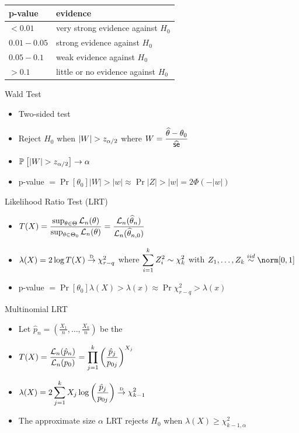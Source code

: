 \documentclass[landscape]{article}
\newenvironment{titemize}[1]{
  \begin{minipage}[h]{\columnwidth}
    #1
    \begin{itemize}
}{
    \end{itemize}
  \end{minipage}
}
\begin{document}
\begin{multicols*}{2}
\centering
\begin{tabular}{ll}
  \textsf{p-value} & \textsf{evidence} \\
  \hline
  $< 0.01$      & very strong evidence against $H_0$ \\
  $0.01 - 0.05$ & strong evidence against $H_0$ \\
  $0.05 - 0.1$  & weak evidence against $H_0$ \\
  $> 0.1$       & little or no evidence against $H_0$ \\
\end{tabular}

\raggedright
Wald Test
\begin{itemize}
  \item Two-sided test
  \item Reject $H_0$ when $|W| > z_{\alpha/2}$ where 
    $W = \displaystyle\frac{\widehat{\theta} - \theta_0}{\widehat{\textsf{se}}}$
  \item $\mathbb{P}_{}\left[|W| > z_{\alpha/2}\right] \rightarrow \alpha$
  \item p-value $= \Pr[\theta_0]{|W| > |w|} 
                 \approx \Pr{|Z| > |w|}
                 = 2\Phi(-|w|)$
\end{itemize}

Likelihood Ratio Test (LRT)
\begin{itemize}
 \item $T(X) = \displaystyle\frac{\sup_{\theta\in\Theta}\Lln(\theta)}%
                                 {\sup_{\theta\in\Theta_0}\Lln(\theta)}
             = \frac{\Lln(\that_n)}{\Lln(\that_{n,0})}$
 \item $\lambda(X) = 2\log T(X) \stackrel{\text{\tiny{D}}}{\rightarrow} \chi_{r-q}^2$ 
  where $\displaystyle\sum_{i=1}^k Z_i^2 \sim \chi_k^2$ with 
    $Z_1,\dots,Z_k \distiid \norm[0,1]$
  \item p-value $= \Pr[\theta_0]{\lambda(X) > \lambda(x)} 
                 \approx \Pr{\chi_{r-q}^2 > \lambda(x)}$
\end{itemize}

\begin{titemize}{Multinomial LRT}
  \item Let 
    $\hat p_n = \displaystyle \left(\frac{X_1}{n},\dots,\frac{X_k}{n}\right)$ 
    be the \mle
 \item $T(X) = \displaystyle \frac{\mathcal{L}_n(\hat p_n)}{\mathcal{L}_n(p_0)}
   = \prod_{j=1}^k \left( \frac{\hat p_j}{p_{0j}} \right)^{X_j}$
 \item $\lambda(X) = \displaystyle 2\sum_{j=1}^k X_j \log 
    \left( \frac{\hat p_j}{p_{0j}} \right) \stackrel{\text{\tiny{D}}}{\rightarrow} \chi_{k-1}^2$ 
 \item The approximate size $\alpha$ LRT rejects $H_0$ when 
   $\lambda(X) \ge \chi_{k-1,\alpha}^2$
\end{titemize}


\end{multicols*}
\end{document}
